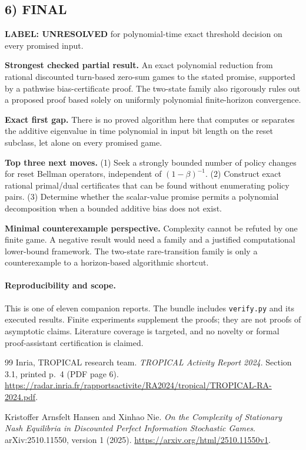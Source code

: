 \documentclass[11pt,a4paper]{article}
\theoremstyle{definition}
\theoremstyle{remark}
\begin{document}
\subsection*{6) FINAL}
\textbf{LABEL: UNRESOLVED} for polynomial-time exact threshold decision on every promised input.

\textbf{Strongest checked partial result.} An exact polynomial reduction from rational discounted turn-based zero-sum games to the stated promise, supported by a pathwise bias-certificate proof. The two-state family also rigorously rules out a proposed proof based solely on uniformly polynomial finite-horizon convergence.

\textbf{Exact first gap.} There is no proved algorithm here that computes or separates the additive eigenvalue in time polynomial in input bit length on the reset subclass, let alone on every promised game.

\textbf{Top three next moves.} (1) Seek a strongly bounded number of policy changes for reset Bellman operators, independent of $(1-\beta)^{-1}$. (2) Construct exact rational primal/dual certificates that can be found without enumerating policy pairs. (3) Determine whether the scalar-value promise permits a polynomial decomposition when a bounded additive bias does not exist.

\textbf{Minimal counterexample perspective.} Complexity cannot be refuted by one finite game. A negative result would need a family and a justified computational lower-bound framework. The two-state rare-transition family is only a counterexample to a horizon-based algorithmic shortcut.

\paragraph{Reproducibility and scope.} This is one of eleven companion reports. The bundle includes \texttt{verify.py} and its executed results. Finite experiments supplement the proofs; they are not proofs of asymptotic claims. Literature coverage is targeted, and no novelty or formal proof-assistant certification is claimed.

\begin{thebibliography}{99}
\small
{}
Inria, TROPICAL research team. \emph{TROPICAL Activity Report 2024}.
Section 3.1, printed p.~4 (PDF page 6).
\url{https://radar.inria.fr/rapportsactivite/RA2024/tropical/TROPICAL-RA-2024.pdf}.

Kristoffer Arnsfelt Hansen and Xinhao Nie.
\emph{On the Complexity of Stationary Nash Equilibria in Discounted Perfect Information Stochastic Games}.
arXiv:2510.11550, version 1 (2025).
\url{https://arxiv.org/html/2510.11550v1}.

\end{thebibliography}
\end{document}
